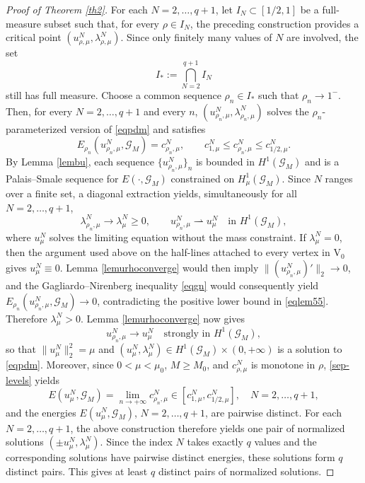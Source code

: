 \documentclass[11pt]{amsart}
\newcommand{\G}{\mathcal{G}}
\newcommand{\V}{\mathrm{V}}
\numberwithin{equation}{section}
\begin{document}
\begin{proof}[Proof of Theorem \ref{th2}]
For each $N=2,\ldots,q+1$, let $I_N\subset[1/2,1]$ be a full-measure subset such that, for every $\rho\in I_N$, the preceding construction provides a critical point $(u_{\rho,\mu}^N,\lambda_{\rho,\mu}^N)$. Since only finitely many values of $N$ are involved, the set
\[
I_*:=\bigcap_{N=2}^{q+1}I_N
\]
still has full measure. Choose a common sequence $\rho_n\in I_*$ such that $\rho_n\to1^-$. Then, for every $N=2,\ldots,q+1$ and every $n$, $(u_{\rho_n,\mu}^N,\lambda_{\rho_n,\mu}^N)$ solves the $\rho_n$-parameterized version of \eqref{eqpdm} and satisfies
\[
E_{\rho_n}(u_{\rho_n,\mu}^N,\G_M)=c_{\rho_n,\mu}^N,
\qquad
c_{1,\mu}^N\leq c_{\rho_n,\mu}^N\leq c_{1/2,\mu}^N.
\]
By Lemma \ref{lembu}, each sequence $\{u_{\rho_n,\mu}^N\}_n$ is bounded in $H^1(\G_M)$ and is a Palais--Smale sequence for $E(\cdot,\G_M)$ constrained on $H^1_\mu(\G_M)$. Since $N$ ranges over a finite set, a diagonal extraction yields, simultaneously for all $N=2,\ldots,q+1$,
\[
\lambda_{\rho_n,\mu}^N\to\lambda_\mu^N\geq0,
\qquad
u_{\rho_n,\mu}^N\rightharpoonup u_\mu^N\quad\text{in }H^1(\G_M),
\]
where $u_\mu^N$ solves the limiting equation without the mass constraint. If $\lambda_\mu^N=0$, then the argument used above on the half-lines attached to every vertex in $\V_0$ gives $u_\mu^N\equiv0$. Lemma \ref{lemurhoconverge} would then imply $\|(u_{\rho_n,\mu}^N)'\|_2\to0$, and the Gagliardo--Nirenberg inequality
\eqref{eqgn} would consequently yield $E_{\rho_n}(u_{\rho_n,\mu}^N,\G_M)\to0$, contradicting the positive lower bound in \eqref{eqlem55}. Therefore $\lambda_\mu^N>0$. Lemma \ref{lemurhoconverge} now gives
\[
u_{\rho_n,\mu}^N\to u_\mu^N\quad\text{strongly in }H^1(\G_M),
\]
so that $\|u_\mu^N\|_2^2=\mu$ and $(u_\mu^N,\lambda_\mu^N)\in H^1(\G_M)\times(0,+\infty)$ is a solution to \eqref{eqpdm}. Moreover, since $0<\mu<\mu_0$, $M\geq M_0$, and $c_{\rho,\mu}^N$ is monotone in $\rho$, \eqref{sep-levels} yields
$$
E(u^N_\mu,\G_M)=\lim_{n\to+\infty}c_{\rho_n,\mu}^N\in\left[c_{1,\mu}^N,
c_{1/2,\mu}^N\right], \quad N= 2,\ldots,q+1,
$$
and the energies $E(u^N_\mu,\G_M)$, $N=2,\ldots,q+1$, are pairwise distinct. For each \(N=2,\ldots,q+1\), the above construction
therefore yields one pair of normalized solutions $(\pm u_\mu^N,\lambda_\mu^N)$.
Since the index \(N\) takes exactly \(q\) values and the corresponding
solutions have pairwise distinct energies, these solutions form \(q\) distinct
pairs. This gives at least $q$ distinct pairs of normalized solutions.
\end{proof}



\iffalse
\end{document}
